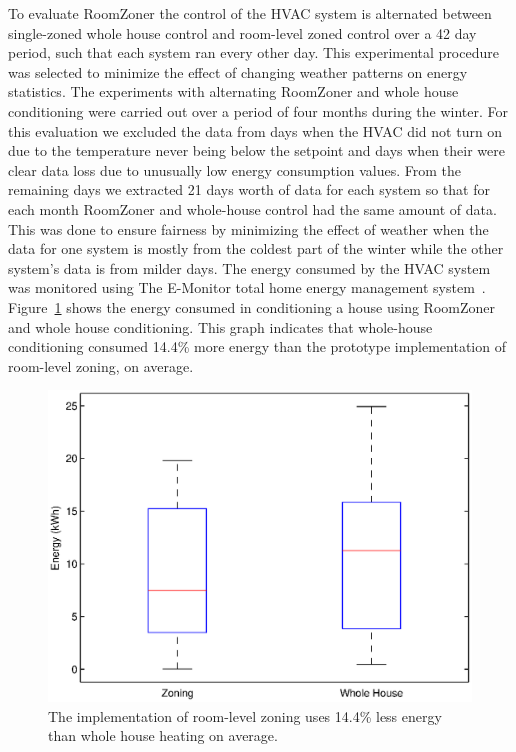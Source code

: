 To evaluate RoomZoner the control of the HVAC system is alternated between
single-zoned whole house control and room-level zoned control over a 42 day
period, such that each system ran every other day. This experimental procedure
was selected to minimize the effect of changing weather patterns on energy
statistics. The experiments with alternating RoomZoner and whole house
conditioning were carried out over a period of four months during the
winter. For this evaluation we excluded the data from days when the HVAC did not
turn on due to the temperature never being below the setpoint and days when
their were clear data loss due to unusually low energy consumption values. From
the remaining days we extracted 21 days worth of data for each system so that
for each month RoomZoner and whole-house control had the same amount of
data. This was done to ensure fairness by minimizing the effect of weather when
the data for one system is mostly from the coldest part of the winter while the
other system's data is from milder days. The energy consumed by the HVAC system
was monitored using The E-Monitor total home energy management
system~\cite{emonitor}. Figure~\ref{fig:cs2energy} shows the energy consumed in
conditioning a house using RoomZoner and whole house conditioning. This graph
indicates that whole-house conditioning consumed 14.4\% more energy than the
prototype implementation of room-level zoning, on average.

\begin{figure}[ht]
  \centering
  \includegraphics[width=0.6\columnwidth]{fig/cs2boxplot.eps}
  \caption[Energy usage of RoomZoner vs. whole house conditioning]{The
  implementation of room-level zoning uses 14.4\% less energy than whole house
  heating on average.}
  \label{fig:cs2energy}
\end{figure}

